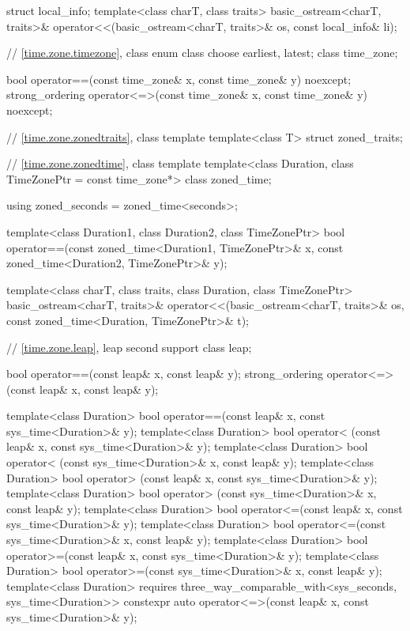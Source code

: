 \begin{codeblock}
{{    struct local_info;
    template<class charT, class traits>
      basic_ostream<charT, traits>&
        operator<<(basic_ostream<charT, traits>& os, const local_info& li);

    // \ref{time.zone.timezone}, class 
    enum class choose {earliest, latest};
    class time_zone;

    bool operator==(const time_zone& x, const time_zone& y) noexcept;
    strong_ordering operator<=>(const time_zone& x, const time_zone& y) noexcept;

    // \ref{time.zone.zonedtraits}, class template 
    template<class T> struct zoned_traits;

    // \ref{time.zone.zonedtime}, class template 
    template<class Duration, class TimeZonePtr = const time_zone*> class zoned_time;

    using zoned_seconds = zoned_time<seconds>;

    template<class Duration1, class Duration2, class TimeZonePtr>
      bool operator==(const zoned_time<Duration1, TimeZonePtr>& x,
                      const zoned_time<Duration2, TimeZonePtr>& y);

    template<class charT, class traits, class Duration, class TimeZonePtr>
      basic_ostream<charT, traits>&
        operator<<(basic_ostream<charT, traits>& os,
                   const zoned_time<Duration, TimeZonePtr>& t);

    // \ref{time.zone.leap}, leap second support
    class leap;

    bool operator==(const leap& x, const leap& y);
    strong_ordering operator<=>(const leap& x, const leap& y);

    template<class Duration>
      bool operator==(const leap& x, const sys_time<Duration>& y);
    template<class Duration>
      bool operator< (const leap& x, const sys_time<Duration>& y);
    template<class Duration>
      bool operator< (const sys_time<Duration>& x, const leap& y);
    template<class Duration>
      bool operator> (const leap& x, const sys_time<Duration>& y);
    template<class Duration>
      bool operator> (const sys_time<Duration>& x, const leap& y);
    template<class Duration>
      bool operator<=(const leap& x, const sys_time<Duration>& y);
    template<class Duration>
      bool operator<=(const sys_time<Duration>& x, const leap& y);
    template<class Duration>
      bool operator>=(const leap& x, const sys_time<Duration>& y);
    template<class Duration>
      bool operator>=(const sys_time<Duration>& x, const leap& y);
    template<class Duration>
      requires three_way_comparable_with<sys_seconds, sys_time<Duration>>
      constexpr auto operator<=>(const leap& x, const sys_time<Duration>& y);

}}
\end{codeblock}
